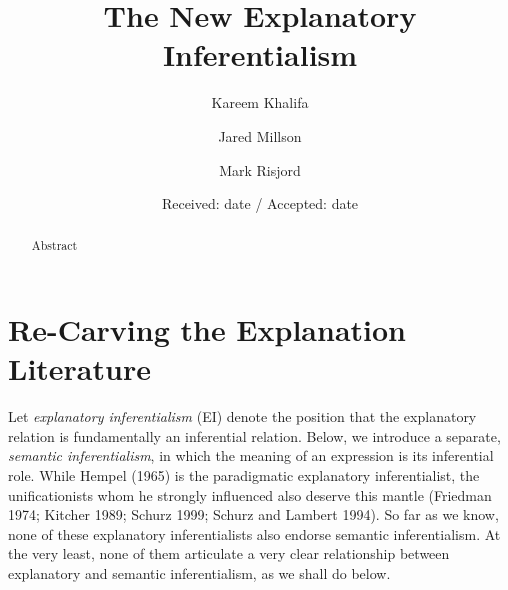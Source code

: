 \documentclass{svjour3}                     %
\begin{document}
\title{The New Explanatory Inferentialism%
}


\author{Kareem Khalifa        \and
        Jared Millson				\and
        Mark Risjord
}



\date{Received: date / Accepted: date}
\raggedbottom

\maketitle

\begin{abstract}
Abstract
\end{abstract}



\section{Re-Carving the Explanation Literature}
\label{sec:background}
Let \textit{explanatory inferentialism} (EI) denote the position that the explanatory relation is fundamentally an inferential relation. Below, we introduce a separate, \textit{semantic inferentialism}, in which the meaning of an expression is its inferential role. While Hempel (1965) is the paradigmatic explanatory inferentialist, the unificationists whom he strongly influenced also deserve this mantle (Friedman 1974; Kitcher 1989; Schurz 1999; Schurz and Lambert 1994). So far as we know, none of these explanatory inferentialists also endorse semantic inferentialism. At the very least, none of them articulate a very clear relationship between explanatory and semantic inferentialism, as we shall do below.
\end{document}
